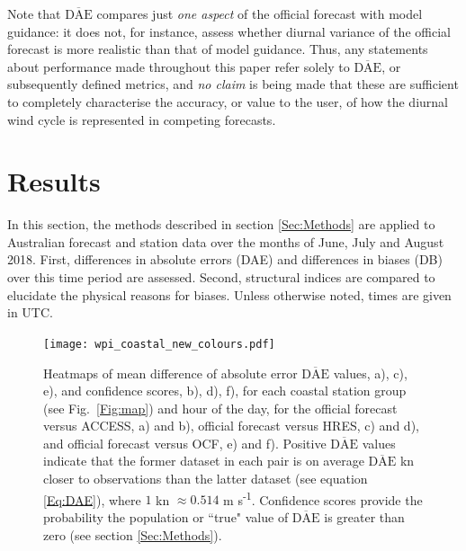 \documentclass[twocol]{ametsoc}
\begin{document}
Note that $\overline{\text{DAE}}$ compares just \textit{one aspect} of the official forecast with model guidance: it does not, for instance, assess whether diurnal variance of the official forecast is more realistic than that of model guidance. Thus, any statements about performance made throughout this paper refer solely to $\overline{\text{DAE}}$, or subsequently defined metrics, and \textit{no claim} is being made that these are sufficient to completely characterise the accuracy, or value to the user, of how the diurnal wind cycle is represented in competing forecasts.

\section{Results}
\label{Sec:Results}
In this section, the methods described in section \ref{Sec:Methods} are applied to Australian forecast and station data over the months of June, July and August 2018. First, differences in absolute errors (DAE) and differences in biases (DB) over this time period are assessed. Second, structural indices are compared to elucidate the physical reasons for biases. Unless otherwise noted, times are given in UTC.

\begin{figure}
\centering
\texttt{[image: wpi\_coastal\_new\_colours.pdf]}
\caption{Heatmaps of mean difference of absolute error $\overline{\text{DAE}}$ values, a), c), e), and confidence scores, b), d), f), for each coastal station group (see Fig.~\ref{Fig:map}) and hour of the day, for the official forecast versus ACCESS, a) and b), official forecast versus HRES, c) and d), and official forecast versus OCF, e) and f). Positive $\overline{\text{DAE}}$ values indicate that the former dataset in each pair is on average $\overline{\text{DAE}}$ kn closer to observations than the latter dataset (see equation \ref{Eq:DAE}), where $1$ kn $\approx 0.514$ m s\textsuperscript{-1}. Confidence scores provide the probability the population or ``true" value of $\overline{\text{DAE}}$ is greater than zero (see section \ref{Sec:Methods}).}
\label{Fig:wpi_coastal}
\end{figure}
\end{document}
